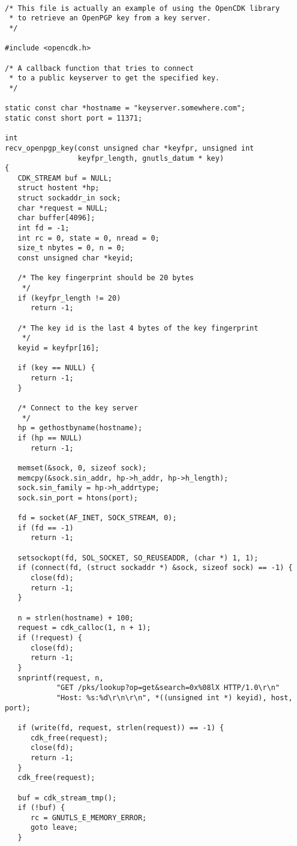\begin {verbatim}

/* This file is actually an example of using the OpenCDK library
 * to retrieve an OpenPGP key from a key server.
 */

#include <opencdk.h>

/* A callback function that tries to connect
 * to a public keyserver to get the specified key.
 */

static const char *hostname = "keyserver.somewhere.com";
static const short port = 11371;

int
recv_openpgp_key(const unsigned char *keyfpr, unsigned int
                 keyfpr_length, gnutls_datum * key)
{
   CDK_STREAM buf = NULL;
   struct hostent *hp;
   struct sockaddr_in sock;
   char *request = NULL;
   char buffer[4096];
   int fd = -1;
   int rc = 0, state = 0, nread = 0;
   size_t nbytes = 0, n = 0;
   const unsigned char *keyid;

   /* The key fingerprint should be 20 bytes
    */
   if (keyfpr_length != 20)
      return -1;

   /* The key id is the last 4 bytes of the key fingerprint
    */
   keyid = keyfpr[16];

   if (key == NULL) {
      return -1;
   }

   /* Connect to the key server 
    */
   hp = gethostbyname(hostname);
   if (hp == NULL)
      return -1;

   memset(&sock, 0, sizeof sock);
   memcpy(&sock.sin_addr, hp->h_addr, hp->h_length);
   sock.sin_family = hp->h_addrtype;
   sock.sin_port = htons(port);

   fd = socket(AF_INET, SOCK_STREAM, 0);
   if (fd == -1)
      return -1;

   setsockopt(fd, SOL_SOCKET, SO_REUSEADDR, (char *) 1, 1);
   if (connect(fd, (struct sockaddr *) &sock, sizeof sock) == -1) {
      close(fd);
      return -1;
   }

   n = strlen(hostname) + 100;
   request = cdk_calloc(1, n + 1);
   if (!request) {
      close(fd);
      return -1;
   }
   snprintf(request, n,
            "GET /pks/lookup?op=get&search=0x%
            "Host: %

   if (write(fd, request, strlen(request)) == -1) {
      cdk_free(request);
      close(fd);
      return -1;
   }
   cdk_free(request);

   buf = cdk_stream_tmp();
   if (!buf) {
      rc = GNUTLS_E_MEMORY_ERROR;
      goto leave;
   }


\end{verbatim}
